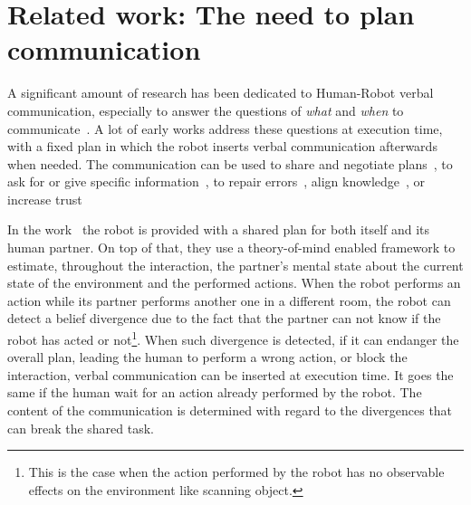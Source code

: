 \section[Related work]{Related work: The need to plan communication}

A significant amount of research has been dedicated to Human-Robot verbal communication, especially to answer the questions of \textit{what} and \textit{when} to communicate~\cite{mavridis_2015_review}. A lot of early works address these questions at execution time, with a fixed plan in which the robot inserts verbal communication afterwards when needed. The communication can be used to share and negotiate plans~\cite{sebastiani_2017_dealing}, to ask for or give specific information~\cite{shah_2011_improved}, to repair errors~\cite{tellex_2014_asking}, align knowledge~\cite{devin_2016_implemented}, or increase trust~\cite{schaefer_2017_communicating}

In the work~\cite{devin_2016_implemented} the robot is provided with a shared plan for both itself and its human partner. On top of that, they use a theory-of-mind enabled framework to estimate, throughout the interaction, the partner's mental state about the current state of the environment and the performed actions. When the robot performs an action while its partner performs another one in a different room, the robot can detect a belief divergence due to the fact that the partner can not know if the robot has acted or not\footnote{This is the case when the action performed by the robot has no observable effects on the environment like scanning object.}. When such divergence is detected, if it can endanger the overall plan, leading the human to perform a wrong action, or block the interaction, verbal communication can be inserted at execution time. It goes the same if the human wait for an action already performed by the robot. The content of the communication is determined with regard to the divergences that can break the shared task.

